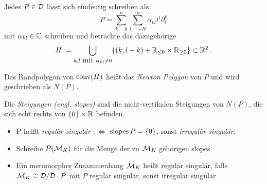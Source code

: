 Jedes $P\in \mathcal{D}$ lässt sich eindeutig schreiben als
\[ P=\sum^{n}_{k=0}{\sum^{\infty}_{l=-N}{\alpha_{kl}t^l\partial_t^k}} \]
mit $\alpha_{kl}\in\mathbb{C}$ schreiben und betrachte das dazugehörige
\[ H:=\underset{k,l\mbox{ mit }\alpha_{kl}\neq0}{\bigcup}\{ (k,l-k) +
  \mathbb{R}_{\leq 0}\times \mathbb{R}_{\geq 0} \}\subset \mathbb{R}^2 \,. \]
\begin{comment}
  bei sabbah: $H\subset \N\times\Z$ und dann konvexe hülle davon in $\R^2$
\end{comment}

\begin{defn} %
  Das Randpolygon von $\operatorname{conv}(H)$ heißt das \emph{Newton Polygon} von $P$ und
  wird geschrieben als $N(P)$.
\end{defn}

\begin{defn} %
  Die \emph{Steigungen (engl. slopes)} sind die nicht-vertikalen Steigungen von
  $N(P)$, die sich echt rechts von $\{0\}\times\mathbb{R}$ befinden.\\ %
  \begin{itemize}
    \item P heißt \emph{regulär singulär} $:\Leftrightarrow$
      $\operatorname{slopes}{P}=\{0\}$, sonst \emph{irregulär singulär}.
      \begin{comment}
        alternativ: $:\Leftrightarrow$ wenn $\conv(H)$ ein Quadrant ist
      \end{comment}
    \item Schreibe $\mathcal{P}(\mathcal{M}_K)$ für die Menge der zu $\mathcal{M}_K$ gehörigen slopes
    \item Ein meromorpher Zusammenhang $\mathcal{M}_K$ heißt regulär singulär, falls
      $\mathcal{M}_K\cong\mathcal{D}/\mathcal{D}\cdot P$ mit $P$ regulär singulär, sonst irregulär
      singulär
      \begin{comment}
        alternativ $:\Leftrightarrow$ $\cP(\cM_K)=\{0\}$
      \end{comment}
  \end{itemize}
\end{defn}

